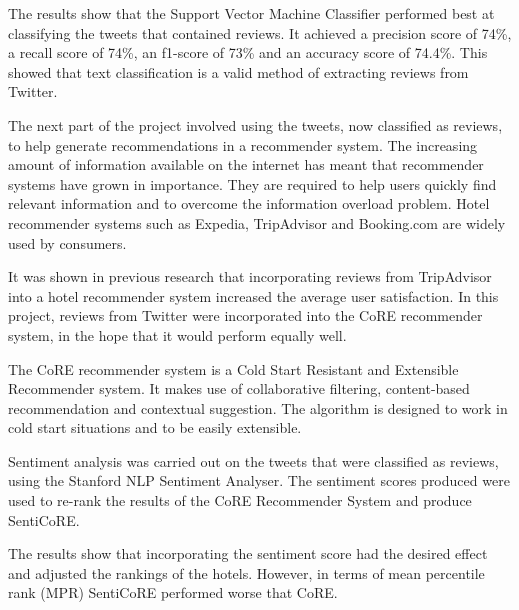 The results show that the Support Vector Machine Classifier performed best at classifying the tweets that contained reviews. It achieved a precision score of 74\%, a recall score of 74\%, an f1-score of 73\% and an accuracy score of 74.4\%. This showed that text classification is a valid method of extracting reviews from Twitter.

The next part of the project involved using the tweets, now classified as reviews, to help generate recommendations in a recommender system. The increasing amount of information available on the internet has meant that recommender systems have grown in importance. They are required to help users quickly find relevant information and to overcome the information overload problem. Hotel recommender systems such as Expedia, TripAdvisor and Booking.com are widely used by consumers.

It was shown in previous research that incorporating reviews from TripAdvisor into a hotel recommender system increased the average user satisfaction. In this project, reviews from Twitter were incorporated into the CoRE recommender system, in the hope that it would perform equally well.

The CoRE recommender system is a Cold Start Resistant and Extensible Recommender system. It makes use of collaborative filtering, content-based recommendation and contextual suggestion. The algorithm is designed to work in cold start situations and to be easily extensible.

Sentiment analysis was carried out on the tweets that were classified as reviews, using the Stanford NLP Sentiment Analyser. The sentiment scores produced were used to re-rank the results of the CoRE Recommender System and produce SentiCoRE.

The results show that incorporating the sentiment score had the desired effect and adjusted the rankings of the hotels. However, in terms of mean percentile rank (MPR) SentiCoRE performed worse that CoRE. 

